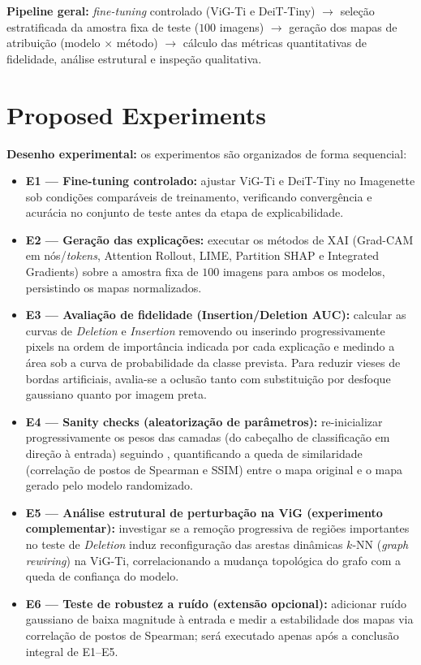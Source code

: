 \documentclass{article}
\begin{document}
\textbf{Pipeline geral:} \textit{fine-tuning} controlado (ViG-Ti e DeiT-Tiny) $\rightarrow$ seleção estratificada da amostra fixa de teste ($100$ imagens) $\rightarrow$ geração dos mapas de atribuição (modelo $\times$ método) $\rightarrow$ cálculo das métricas quantitativas de fidelidade, análise estrutural e inspeção qualitativa.

\section{Proposed Experiments}
\label{sec:exp}

\textbf{Desenho experimental:} os experimentos são organizados de forma sequencial:
\begin{itemize}
    \item \textbf{E1 --- Fine-tuning controlado:} ajustar ViG-Ti e DeiT-Tiny no Imagenette sob condições comparáveis de treinamento, verificando convergência e acurácia no conjunto de teste antes da etapa de explicabilidade.
    \item \textbf{E2 --- Geração das explicações:} executar os métodos de XAI (Grad-CAM em nós/\textit{tokens}, Attention Rollout, LIME, Partition SHAP e Integrated Gradients) sobre a amostra fixa de $100$ imagens para ambos os modelos, persistindo os mapas normalizados.
    \item \textbf{E3 --- Avaliação de fidelidade (Insertion/Deletion AUC):} calcular as curvas de \textit{Deletion} e \textit{Insertion} \citep{petsiuk2018rise} removendo ou inserindo progressivamente pixels na ordem de importância indicada por cada explicação e medindo a área sob a curva de probabilidade da classe prevista. Para reduzir vieses de bordas artificiais, avalia-se a oclusão tanto com substituição por desfoque gaussiano quanto por imagem preta.
    \item \textbf{E4 --- Sanity checks (aleatorização de parâmetros):} re-inicializar progressivamente os pesos das camadas (do cabeçalho de classificação em direção à entrada) seguindo \citet{adebayo2018sanity}, quantificando a queda de similaridade (correlação de postos de Spearman e SSIM) entre o mapa original e o mapa gerado pelo modelo randomizado.
    \item \textbf{E5 --- Análise estrutural de perturbação na ViG (experimento complementar):} investigar se a remoção progressiva de regiões importantes no teste de \textit{Deletion} induz reconfiguração das arestas dinâmicas $k$-NN (\textit{graph rewiring}) na ViG-Ti, correlacionando a mudança topológica do grafo com a queda de confiança do modelo.
    \item \textbf{E6 --- Teste de robustez a ruído (extensão opcional):} adicionar ruído gaussiano de baixa magnitude à entrada e medir a estabilidade dos mapas via correlação de postos de Spearman; será executado apenas após a conclusão integral de E1--E5.
\end{itemize}
\end{document}
